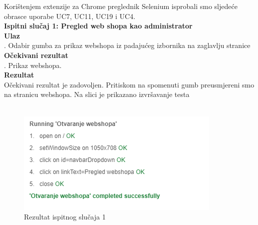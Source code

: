 {			 
			 Korištenjem extenzije za Chrome preglednik Selenium isprobali smo sljedeće obrasce uporabe UC7, UC11, UC19 i UC4.
			 \\
			 \noindent \textbf{Ispitni slučaj 1: Pregled web shopa kao administrator}
			 \\
			 \textbf{Ulaz}
			 \\
			 . Odabir gumba za prikaz webshopa iz padajućeg izbornika na zaglavlju stranice \\
			 \textbf{Očekivani rezultat}
			 \\
			 . Prikaz webshopa. \\
			 \textbf{Rezultat}
			 \\
			 \indent Očekivani rezultat je zadovoljen. Pritiskom na spomenuti gumb preusmjereni smo na stranicu webshopa. Na slici je prikazano izvršavanje testa
			 \\ \\
			 \begin{figure}[H]
			 	\centering
			 	\includegraphics[scale=0.7]{"slike/test7"}
			 	\caption{Rezultat ispitnog slučaja 1}
			 	\label{fig:rezultat-ispitnog-slucaja-7}
			 \end{figure}
			 
}
